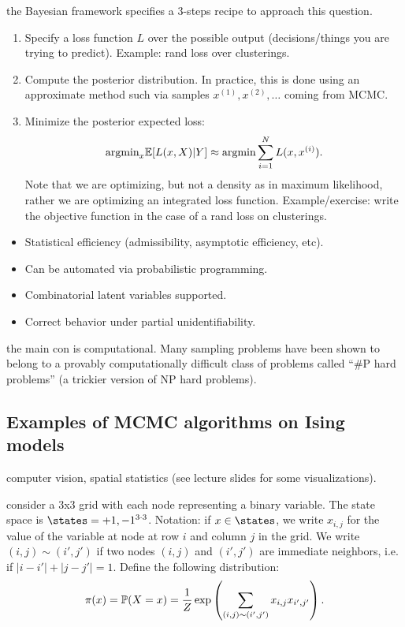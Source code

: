 \documentclass{article}
\begin{document}
 the Bayesian framework specifies a 3-steps recipe to approach this question.
\begin{enumerate}
  \item Specify a loss function $L$ over the possible output (decisions/things you are trying to predict). Example: rand loss over clusterings.
  \item Compute the posterior distribution. In practice, this is done using an approximate method such via samples $x^{(1)}, x^{(2)}, \dots$ coming from MCMC.
  \item Minimize the posterior expected loss:
\[ \text{argmin}_x \E[L(x, X)|Y] \approx \text{argmin} \sum_{i=1}^N L(x, x^{(i)}). \] Note that we are optimizing, but not a density as in maximum likelihood, rather we are optimizing an integrated loss function. Example/exercise: write the objective function in the case of a rand loss on clusterings.
\end{enumerate}

\begin{itemize}
  \item Statistical efficiency (admissibility, asymptotic efficiency, etc).
  \item Can be automated via probabilistic programming.
  \item Combinatorial latent variables supported.
  \item Correct behavior under partial unidentifiability.
\end{itemize}

 the main con is computational. Many sampling problems have been shown to belong to a provably computationally difficult class of problems called ``\#P hard problems'' (a trickier version of NP hard problems). 


\subsection{Examples of MCMC algorithms on Ising models}

 computer vision, spatial statistics (see lecture slides for some visualizations).

 consider a 3x3 grid with each node representing a binary variable. The state space is $\states = {+1, -1}^{3\cdot 3}$. Notation: if $x \in \states$, we write $x_{i,j}$ for the value of the variable at node at row $i$ and column $j$ in the grid. We write $(i,j) \sim (i',j')$ if two nodes $(i,j)$ and $(i',j')$ are immediate neighbors, i.e. if $|i-i'| + |j-j'| = 1$. Define the following distribution:
\begin{equation}\label{eq:target}
\pi(x) = \P(X = x) = \frac{1}{Z} \exp\left( \sum_{(i,j)\sim(i',j')} x_{i,j} x_{i',j'} \right).
\end{equation}
\end{document}

